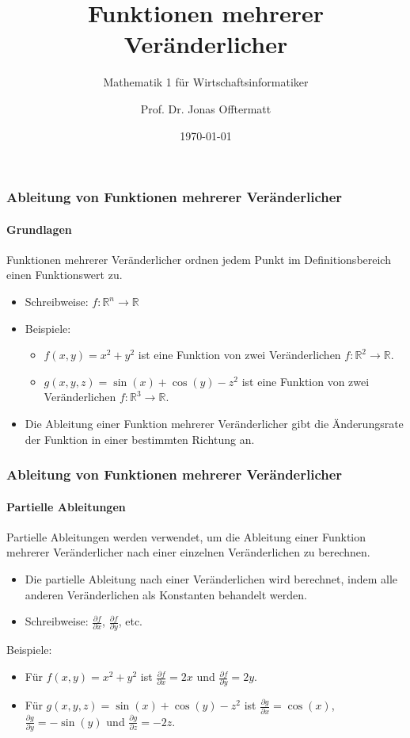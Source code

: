 \documentclass{beamer}
\title{Funktionen mehrerer Veränderlicher}
\subtitle{Mathematik 1 für Wirtschaftsinformatiker}
\author{Prof. Dr. Jonas Offtermatt}
\date{\today}
\begin{document}
\begin{frame}
  \titlepage
\end{frame}

\begin{frame}
  \frametitle{Ableitung von Funktionen mehrerer Veränderlicher}
  \framesubtitle{Grundlagen}
  Funktionen mehrerer Veränderlicher ordnen jedem Punkt im Definitionsbereich einen Funktionswert zu.
  \begin{itemize}
    \item Schreibweise: $f: \mathbb{R}^n \to \mathbb{R}$
    \item Beispiele:
      \begin{itemize}
        \item $f(x, y) = x^2 + y^2$ ist eine Funktion von zwei Veränderlichen $f: \mathbb{R}^2 \to \mathbb{R}$.
        \item $g(x, y, z) = \sin(x) + \cos(y) - z^2$ ist eine Funktion von zwei Veränderlichen $f: \mathbb{R}^3 \to \mathbb{R}$.
      \end{itemize}
    \item Die Ableitung einer Funktion mehrerer Veränderlicher gibt die Änderungsrate der Funktion in einer bestimmten Richtung an.
  \end{itemize}
\end{frame}

\begin{frame}
  \frametitle{Ableitung von Funktionen mehrerer Veränderlicher}
  \framesubtitle{Partielle Ableitungen}

  Partielle Ableitungen werden verwendet, um die Ableitung einer Funktion mehrerer Veränderlicher nach einer einzelnen Veränderlichen zu berechnen.
  \begin{itemize}
    \item Die partielle Ableitung nach einer Veränderlichen wird berechnet, indem alle anderen Veränderlichen als Konstanten behandelt werden.
    \item Schreibweise: $\frac{\partial f}{\partial x}$, $\frac{\partial f}{\partial y}$, etc.
  \end{itemize}
  Beispiele:
      \begin{itemize}
        \item Für $f(x, y) = x^2 + y^2$ ist $\frac{\partial f}{\partial x} = 2x$ und $\frac{\partial f}{\partial y} = 2y$.
        \item Für $g(x, y, z) = \sin(x) + \cos(y) - z^2$ ist $\frac{\partial g}{\partial x} = \cos(x)$, $\frac{\partial g}{\partial y} = -\sin(y)$ und $\frac{\partial g}{\partial z} = -2z$.
      \end{itemize}

\end{frame}
\end{document}

